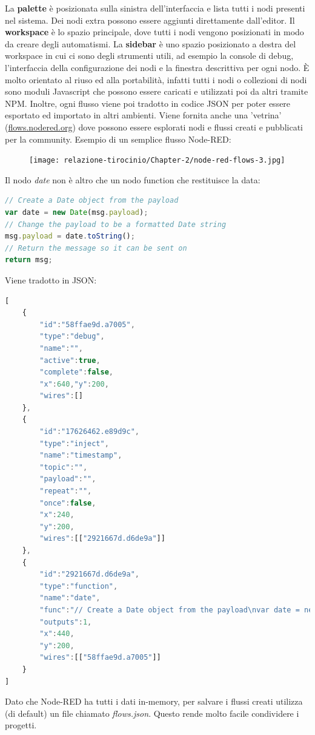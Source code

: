 \documentclass[a4paper,10pt]{memoir}
\begin{document}
La \textbf{palette} è posizionata sulla sinistra dell'interfaccia e lista tutti i nodi presenti nel sistema. Dei nodi extra possono essere aggiunti direttamente dall'editor.
Il \textbf{workspace} è lo spazio principale, dove tutti i nodi vengono posizionati in modo da creare degli automatismi.
La \textbf{sidebar} è uno spazio posizionato a destra del workspace in cui ci sono degli strumenti utili, ad esempio la console di debug, l'interfaccia della configurazione dei nodi e la finestra descrittiva per ogni nodo.
È molto orientato al riuso ed alla portabilità, infatti tutti i nodi o collezioni di nodi sono moduli Javascript che possono essere caricati e utilizzati poi da altri tramite NPM.
Inoltre, ogni flusso viene poi tradotto in codice JSON per poter essere esportato ed importato in altri ambienti.
Viene fornita anche una 'vetrina' (\href{https://flows.nodered.org}{flows.nodered.org}) dove possono essere esplorati nodi e flussi creati e pubblicati per la community.
Esempio di un semplice flusso Node-RED:
\begin{figure}[H]
\texttt{[image: relazione-tirocinio/Chapter-2/node-red-flows-3.jpg]}
\end{figure}
Il nodo \textit{date} non è altro che un nodo function che restituisce la data:
\begin{lstlisting}[language=JavaScript]
// Create a Date object from the payload
var date = new Date(msg.payload);
// Change the payload to be a formatted Date string
msg.payload = date.toString();
// Return the message so it can be sent on
return msg;
\end{lstlisting}
Viene tradotto in JSON:
\begin{lstlisting}[language=JavaScript]
[
    {
        "id":"58ffae9d.a7005",
        "type":"debug",
        "name":"",
        "active":true,
        "complete":false,
        "x":640,"y":200,
        "wires":[]
    },
    {
        "id":"17626462.e89d9c",
        "type":"inject",
        "name":"timestamp",
        "topic":"",
        "payload":"",
        "repeat":"",
        "once":false,
        "x":240,
        "y":200,
        "wires":[["2921667d.d6de9a"]]
    },
    {
        "id":"2921667d.d6de9a",
        "type":"function",
        "name":"date",
        "func":"// Create a Date object from the payload\nvar date = new Date(msg.payload);\n// Change the payload to be a formatted Date string\nmsg.payload = date.toString();\n// Return the message so it can be sent on\nreturn msg;",
        "outputs":1,
        "x":440,
        "y":200,
        "wires":[["58ffae9d.a7005"]]
    }
]
\end{lstlisting}
Dato che Node-RED ha tutti i dati in-memory, per salvare i flussi creati utilizza (di default) un file chiamato \textit{flows.json}. Questo rende molto facile condividere i progetti.
\end{document}
